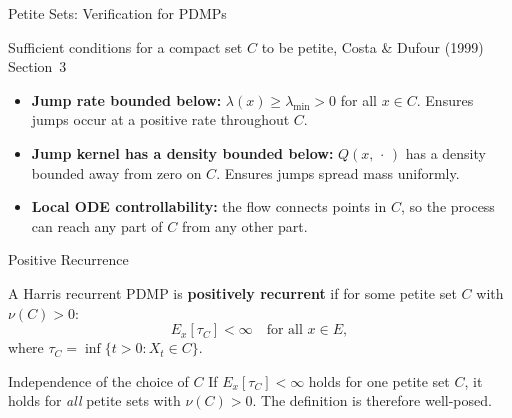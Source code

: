 \documentclass[aspectratio=169]{beamer}
\begin{document}
\begin{frame}{Petite Sets: Verification for PDMPs}

  \begin{block}{Sufficient conditions for a compact set $C$ to be
                petite, Costa \& Dufour (1999) Section~3}
    \begin{itemize}
      \setlength\itemsep{6pt}
      \item \textbf{Jump rate bounded below:}
            $\lambda(x) \geq \lambda_{\min} > 0$ for all $x \in C$.
            Ensures jumps occur at a positive rate throughout $C$.
      \item \textbf{Jump kernel has a density bounded below:}
            $Q(x,\,\cdot\,)$ has a density bounded away from zero on
            $C$. Ensures jumps spread mass uniformly.
      \item \textbf{Local ODE controllability:}
            the flow connects points in $C$, so the process can
            reach any part of $C$ from any other part.
    \end{itemize}
  \end{block}


\end{frame}

\begin{frame}{Positive Recurrence}

  \begin{definition}
    A Harris recurrent PDMP is \textbf{positively recurrent} if for
    some petite set $C$ with $\nu(C) > 0$:
    \[
      E_x[\tau_C] < \infty \quad \text{for all } x \in E,
    \]
    where $\tau_C = \inf\{t > 0 : X_t \in C\}$.
  \end{definition}

  \bigskip
  \begin{block}{Independence of the choice of $C$}
    If $E_x[\tau_C] < \infty$ holds for one petite set $C$, it holds
    for \emph{all} petite sets with $\nu(C) > 0$. The definition is
    therefore well-posed.
  \end{block}

\end{frame}
\end{document}
